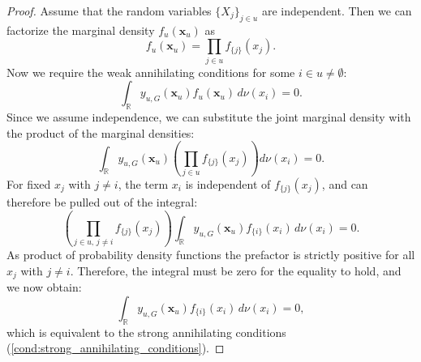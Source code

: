 \begin{proof}
Assume that the random variables $\{X_j\}_{j \in u}$ are independent. Then we can factorize the marginal density $f_u(\boldsymbol{x}_u)$ as
\[
f_u(\boldsymbol{x}_u) = \prod_{j \in u} f_{\{j\}}(x_j).
\]
Now we require the weak annihilating conditions for some $i \in u \neq \emptyset$:
\[
\int_{\mathbb{R}} y_{u,G}(\boldsymbol{x}_u) f_u(\boldsymbol{x}_u) \, d \nu(x_i) = 0.
\]
Since we assume independence, we can substitute the joint marginal density with the product of the marginal densities:
\[
\int_{\mathbb{R}} y_{u,G}(\boldsymbol{x}_u) \left( \prod_{j \in u} f_{{\{j\}}}(x_j) \right) d \nu(x_i) = 0.
\]
For fixed $x_j$ with $j \ne i$, the term $x_i$ is independent of $f_{{\{j\}}}(x_j)$, and can therefore be pulled out of the integral:
\[
\left( \prod_{j \in u,\, j \ne i} f_{{\{j\}}}(x_j) \right) \int_{\mathbb{R}} y_{u,G}(\boldsymbol{x}_u) f_{{\{i\}}}(x_i) \, d \nu(x_i) = 0.
\]
As product of probability density functions the prefactor is strictly positive for all $x_j$ with $j \ne i$. Therefore, the integral must be zero for the equality to hold, and we now obtain:
\[
\int_{\mathbb{R}} y_{u,G}(\boldsymbol{x}_u) f_{{\{i\}}}(x_i) \, d \nu(x_i) = 0,
\]
which is equivalent to the strong annihilating conditions (\autoref{cond:strong_annihilating_conditions}).
\end{proof}

